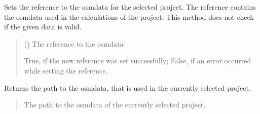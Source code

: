 \documentclass[letterpaper,10pt,english]{sphinxmanual}
\begin{document}
\begin{fulllineitems}
\begin{fulllineitems}
\label{\detokenize{apidoc/src.osm_configurator.control:src.osm_configurator.control.osm_data_controller.OSMDataController.set_osm_data_reference}}
\pysigstartsignatures
{}
\pysigstopsignatures
\sphinxAtStartPar
Sets the reference to the osm\sphinxhyphen{}data for the selected project.
The reference contains the osm\sphinxhyphen{}data used in the calculations of the project. This method does not check if the given data is valid.
\begin{quote}\begin{description}
\sphinxAtStartPar
{} () \textendash{} The reference to the osm\sphinxhyphen{}data

\sphinxAtStartPar
True, if the new reference was set successfully; False, if an error occurred while setting the reference.

\sphinxAtStartPar
{}

\end{description}\end{quote}

\end{fulllineitems}


\begin{fulllineitems}
\label{\detokenize{apidoc/src.osm_configurator.control:src.osm_configurator.control.osm_data_controller.OSMDataController.get_osm_data_reference}}
\pysigstartsignatures
{}
\pysigstopsignatures
\sphinxAtStartPar
Returns the path to the osm\sphinxhyphen{}data, that is used in the currently selected project.
\begin{quote}\begin{description}
\sphinxAtStartPar
The path to the osm\sphinxhyphen{}data of the currently selected project.

\sphinxAtStartPar
{}


\end{description}
\end{quote}
\end{fulllineitems}
\end{fulllineitems}
\end{document}

